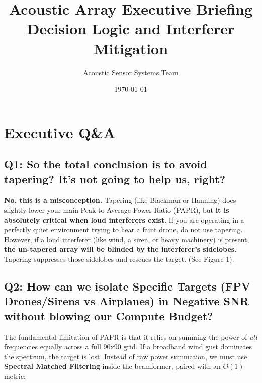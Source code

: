 \documentclass[12pt,letterpaper]{article}
\title{\textbf{Acoustic Array Executive Briefing}\\ \Large Decision Logic and Interferer Mitigation}
\author{Acoustic Sensor Systems Team}
\date{\today}
\begin{document}
\maketitle

\section*{Executive Q\&A}

\subsection*{Q1: So the total conclusion is to avoid tapering? It's not going to help us, right?}
\textbf{No, this is a misconception.} Tapering (like Blackman or Hanning) does slightly lower your main Peak-to-Average Power Ratio (PAPR), but \textbf{it is absolutely critical when loud interferers exist}.
If you are operating in a perfectly quiet environment trying to hear a faint drone, do not use tapering. However, if a loud interferer (like wind, a siren, or heavy machinery) is present, \textbf{the un-tapered array will be blinded by the interferer's sidelobes}. Tapering suppresses those sidelobes and rescues the target. (See Figure 1).

\subsection*{Q2: How can we isolate Specific Targets (FPV Drones/Sirens vs Airplanes) in Negative SNR without blowing our Compute Budget?}
The fundamental limitation of PAPR is that it relies on summing the power of \textit{all} frequencies equally across a full 90x90 grid. If a broadband wind gust dominates the spectrum, the target is lost.
Instead of raw power summation, we must use \textbf{Spectral Matched Filtering} inside the beamformer, paired with an $O(1)$ metric:
\end{document}
